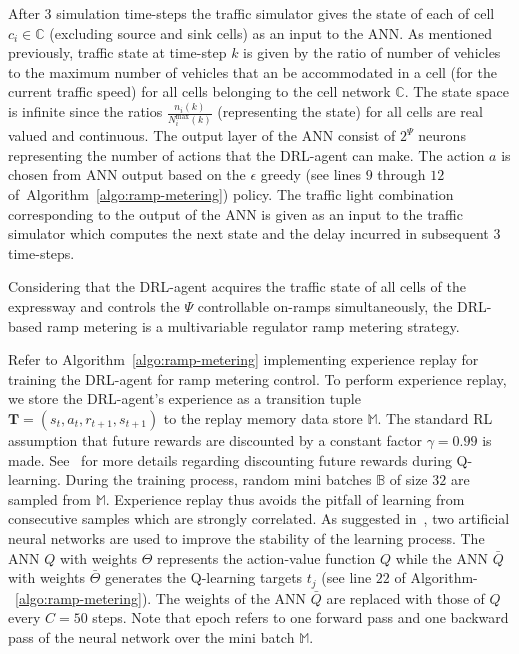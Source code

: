 \documentclass[conference]{IEEEtran}
\begin{document}
After $3$ simulation time-steps the traffic simulator gives the state of each of cell $c_i \in \mathbb{C}$ (excluding source and sink cells) as an input to the \ac{ANN}.  As mentioned previously, traffic state at time-step $k$ is given by the ratio of number of vehicles to the maximum number of vehicles that an be accommodated in a cell (for the current traffic speed) for all cells belonging to the cell network $\mathbb{C}$. The state space is infinite since the ratios $\frac{n_i(k)}{N_i^{\text{max}}(k)}$ (representing the state) for all cells are real valued and continuous. The output layer of the \ac{ANN} consist of $2^\Psi$ neurons representing the number of actions that the DRL-agent can make. The action $a$ is chosen from \ac{ANN} output based on the $\epsilon$ greedy (see lines $9$ through $12$ of~Algorithm~\ref{algo:ramp-metering}) policy. The traffic light combination corresponding to the output of the \ac{ANN} is given as an input to the traffic simulator which computes the next state and the delay incurred in subsequent $3$ time-steps. 

Considering that the DRL-agent acquires the traffic state of all cells of the expressway and controls the $\Psi$ controllable on-ramps simultaneously, the DRL-based ramp metering is a multivariable regulator ramp metering strategy.

Refer to Algorithm~\ref{algo:ramp-metering} implementing experience replay for training the DRL-agent for ramp metering control. To perform experience replay,  we store the DRL-agent's experience as a transition tuple  $\mathbf{T}=(s_t, a_t,r_{t+1}, s_{t+1})$ to the replay memory data store $\mathbb{M}$.  The standard RL assumption that future rewards are discounted by a constant factor $\gamma=0.99$ is made. See~\cite{sutton1998reinforcement} for more details regarding discounting future rewards during Q-learning. During the training process, random mini batches $\mathbb{B}$ of size $32$  are sampled  from  $\mathbb{M}$. Experience replay thus avoids the pitfall of learning from consecutive samples which are strongly correlated. As suggested in~\cite{mnih2015human}, two artificial neural networks are used to improve the stability of the learning process. The \ac{ANN} $Q$ with weights $\Theta$ represents the action-value function $Q$ while the \ac{ANN} $\bar{Q}$ with weights $\bar{\Theta}$ generates the Q-learning targets $t_j$ (see line $22$ of Algorithm-~\ref{algo:ramp-metering}). The weights of the \ac{ANN} $\bar{Q}$ are replaced with those of $Q$ every $C=50$ steps. Note that $\text{epoch}$ refers to one forward pass and one backward pass of the neural network over the mini batch $\mathbb{M}$.
\end{document}
